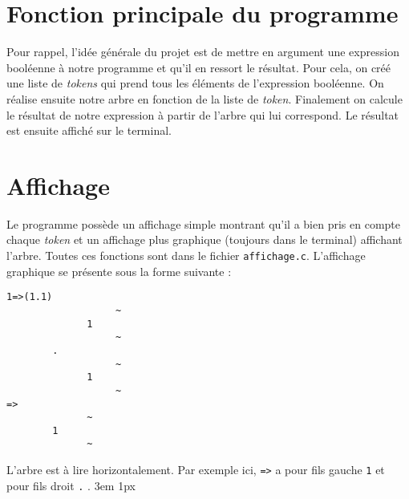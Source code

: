 \documentclass{Support}
\begin{document}
\section{Fonction principale du programme}
Pour rappel, l'idée générale du projet est de mettre en argument une expression booléenne à notre programme et qu'il en ressort le résultat. Pour cela, on créé une liste de \textit{tokens} qui prend tous les éléments de l'expression booléenne. On réalise ensuite notre arbre en fonction de la liste de \textit{token}. Finalement on calcule le résultat de notre expression à partir de l'arbre qui lui correspond. Le résultat est ensuite affiché sur le terminal.

\section{Affichage}
Le programme possède un affichage simple montrant qu'il a bien pris en compte chaque \textit{token} et un affichage plus graphique (toujours dans le terminal) affichant l'arbre. Toutes ces fonctions sont dans le fichier \verb|affichage.c|. L'affichage graphique se présente sous la forme suivante :
\begin{lstlisting}
1=>(1.1)
			       ~
		      1
			       ~
	    .
			       ~
		      1
			       ~
=>
		      ~
	    1
		      ~
\end{lstlisting}
L'arbre est à lire horizontalement. Par exemple ici, \verb|=>| a pour fils gauche \verb|1| et pour fils droit \verb|.| .
\singlespacing
\emergencystretch 3em
\hfuzz 1px
\end{document}
